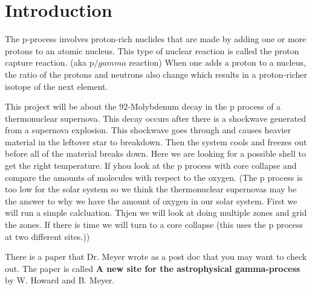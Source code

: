 \section*{Introduction}
The p-process involves proton-rich nuclides that are made by adding one or more protons to an atomic nucleus. This type of nuclear reaction is called the proton capture reaction. (aka p$/gamma$ reaction) When one adds a proton to a nucleus, the ratio of the protons and neutrons also change which results in a proton-richer isotope of the next element. 

This project will be about the  $92$-Molybdenum decay in the p process of a thermonuclear supernova.  This decay occurs after there is a shockwave generated from a supernova explosion. This shockwave goes through and causes heavier material in the leftover star to breakdown. Then the system cools and freezes out before all of the material breaks down.  Here we are looking for a possible shell to get the right temperature. If yhou look at the p process with core collapse and compare the amounts of molecules with respect to the oxygen. (The p process is too low for the solar system so we think the thermonuclear supernovas may be the answer to why we have the amount of oxygen in our solar system. First we will run a simple calcluation. Thjen we will look at doing multiple zones and grid the zones. If there is time we will turn to a core collapse (this uses the p process at two different sites.))

There is a paper that Dr. Meyer wrote as a post doc that you may want to check out. The paper is called {\bf A new site for the astrophysical gamma-process} by W. Howard and B. Meyer. 



